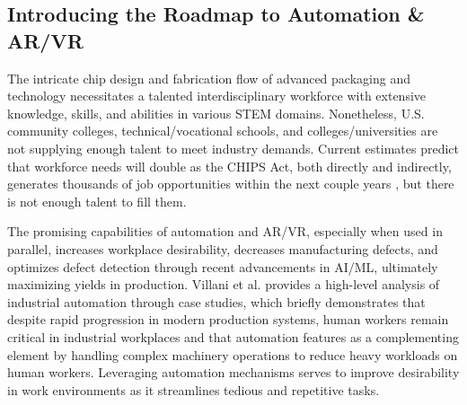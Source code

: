 \subsection{Introducing the Roadmap to Automation \& AR/VR}\label{sec2_3:roadmap_automation_VR_AR}

The intricate chip design and fabrication flow of advanced packaging and technology necessitates a talented interdisciplinary workforce with extensive knowledge, skills, and abilities in various STEM domains. Nonetheless, U.S. community colleges, technical/vocational schools, and colleges/universities are not supplying enough talent to meet industry demands. Current estimates predict that workforce needs will double as the CHIPS Act, both directly and indirectly, generates thousands of job opportunities within the next couple years \cite{sia_2022}, but there is not enough talent to fill them.

The promising capabilities of automation and AR/VR, especially when used in parallel, increases workplace desirability, decreases manufacturing defects, and optimizes defect detection through recent advancements in AI/ML, ultimately maximizing yields in production.  Villani et al. \cite{Villani2021TheIS} provides a high-level analysis of industrial automation through case studies, which briefly demonstrates that despite rapid progression in modern production systems, human workers remain critical in industrial workplaces and that automation features as a complementing element by handling complex machinery operations to reduce heavy workloads on human workers. Leveraging automation mechanisms serves to improve desirability in work environments as it streamlines tedious and repetitive tasks.


